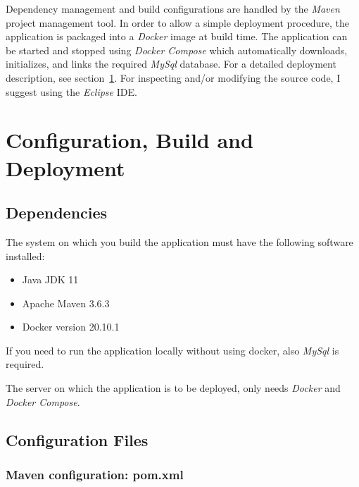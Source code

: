 \documentclass[fleqn]{article}
\begin{document}
Dependency management and build configurations are handled by the \emph{Maven} project management tool.
In order to allow a simple deployment procedure, the application is packaged into a \emph{Docker} image
at build time. The application can be started and stopped using \emph{Docker Compose} which automatically
downloads, initializes, and links the required \emph{MySql} database.
For a detailed deployment description, see section~\ref{sec:deployment}. 
For inspecting and/or modifying the source code, I suggest using the \emph{Eclipse} IDE.

\section{Configuration, Build and Deployment}
\label{sec:deployment}

\subsection{Dependencies}

The system on which you build the application must have the following software installed:

\begin{itemize}

\item Java JDK 11

\item Apache Maven 3.6.3

\item Docker version 20.10.1

\end{itemize}

If you need to run the application locally without using docker, also \emph{MySql} is required. 

The server on which the application is to be deployed, only needs \emph{Docker} and \emph{Docker Compose}.

\subsection{Configuration Files}

\subsubsection{Maven configuration: pom.xml}
\end{document}
